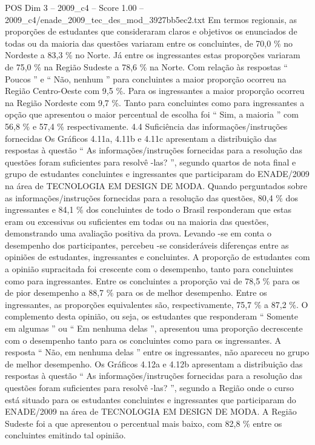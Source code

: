 \begin{textsample}{POS Dim 3 – 2009\_c4 – Score 1.00 – 2009\_c4/enade\_2009\_tec\_des\_mod\_3927bb5ec2.txt}
Em termos regionais, as proporções de estudantes que consideraram claros e objetivos os enunciados de todas ou da maioria das questões variaram entre os concluintes, de 70,0 \% no Nordeste a 83,3 \% no Norte.
Já entre os ingressantes estas proporções variaram de 75,0 \% na Região Sudeste a 78,6 \% na Norte.
Com relação às respostas “ Poucos ” e “ Não, nenhum ” para concluintes a maior proporção ocorreu na Região Centro-Oeste com 9,5 \%.
Para os ingressantes a maior proporção ocorreu na Região Nordeste com 9,7 \%.
Tanto para concluintes como para ingressantes a opção que apresentou o maior percentual de escolha foi “ Sim, a maioria ” com 56,8 \% e 57,4 \% respectivamente. 4.4 Suficiência das informações/instruções fornecidas Os Gráficos 4.11a, 4.11b e 4.11c apresentam a distribuição das respostas à questão “ As informações/instruções fornecidas para a resolução das questões foram suficientes para resolvê -las? ”, segundo quartos de nota final e grupo de estudantes concluintes e ingressantes que participaram do ENADE/2009 na área de TECNOLOGIA EM DESIGN DE MODA.
Quando perguntados sobre as informações/instruções fornecidas para a resolução das questões, 80,4 \% dos ingressantes e 84,1 \% dos concluintes de todo o Brasil responderam que estas eram ou excessivas ou suficientes em todas ou na maioria das questões, demonstrando uma avaliação positiva da prova.
Levando -se em conta o desempenho dos participantes, percebeu -se consideráveis diferenças entre as opiniões de estudantes, ingressantes e concluintes.
A proporção de estudantes com a opinião supracitada foi crescente com o desempenho, tanto para concluintes como para ingressantes.
Entre os concluintes a proporção vai de 78,5 \% para os de pior desempenho a 88,7 \% para os de melhor desempenho.
Entre os ingressantes, as proporções equivalentes são, respectivamente, 75,7 \% a 87,2 \%.
O complemento desta opinião, ou seja, os estudantes que responderam “ Somente em algumas ” ou “ Em nenhuma delas ”, apresentou uma proporção decrescente com o desempenho tanto para os concluintes como para os ingressantes.
A resposta “ Não, em nenhuma delas ” entre os ingressantes, não apareceu no grupo de melhor desempenho.
Os Gráficos 4.12a e 4.12b apresentam a distribuição das respostas à questão “ As informações/instruções fornecidas para a resolução das questões foram suficientes para resolvê -las? ”, segundo a Região onde o curso está situado para os estudantes concluintes e ingressantes que participaram do ENADE/2009 na área de TECNOLOGIA EM DESIGN DE MODA.
A Região Sudeste foi a que apresentou o percentual mais baixo, com 82,8 \% entre os concluintes emitindo tal opinião.

\end{textsample}
